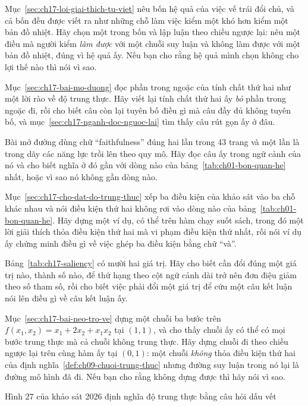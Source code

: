 \cauhoi
\begin{cauhoids}
  \item Mục~\ref{sec:ch17-loi-giai-thich-tu-viet} nêu bốn hệ quả của việc vế trái
đổi chủ, và cả bốn đều được viết ra như những chỗ làm việc kiểm một
khó hơn kiểm một bản đồ nhiệt. Hãy chọn một trong bốn và lập luận theo chiều
ngược lại: nêu một điều mà người kiểm \emph{làm được} với một chuỗi suy luận và
không làm được với một bản đồ nhiệt, đúng vì hệ quả ấy. Nếu bạn cho rằng hệ quả
mình chọn không cho lợi thế nào thì nói vì sao.
  \item Mục~\ref{sec:ch17-bai-mo-duong} đọc phần trong ngoặc của tính chất thứ
hai như một lời rào về độ trung thực. Hãy viết lại tính chất thứ hai ấy \emph{bỏ}
phần trong ngoặc đi, rồi cho biết câu còn lại tuyên bố điều gì mà câu đầy đủ
không tuyên bố, và mục~\ref{sec:ch17-nganh-doc-nguoc-lai} tìm thấy câu rút gọn ấy
ở đâu.
  \item Bài mở đường dùng chữ \enquote{faithfulness} đúng hai lần trong 43 trang
và một lần là trong dãy các năng lực trồi lên theo quy mô. Hãy đọc câu ấy trong
ngữ cảnh của nó và cho biết nghĩa ở đó gần với dòng nào của
bảng~\ref{tab:ch01-bon-quan-he} nhất, hoặc vì sao nó không gần dòng nào.
  \item Mục~\ref{sec:ch17-cho-dat-do-trung-thuc} xếp ba điều kiện của khảo sát
vào ba chỗ khác nhau và nói điều kiện thứ hai không rơi vào dòng nào của
bảng~\ref{tab:ch01-bon-quan-he}. Hãy dựng một ví dụ, có thể trên hàm chạy suốt
sách, trong đó một lời giải thích thỏa điều kiện thứ hai mà vi phạm điều kiện thứ
nhất, rồi nói ví dụ ấy chứng minh điều gì về việc ghép ba điều kiện bằng chữ
\enquote{và}.
  \item Bảng~\ref{tab:ch17-saliency} có mười hai giá trị. Hãy cho biết cần đổi
đúng một giá trị nào, thành số nào, để thứ hạng theo cột ngữ cảnh dài trở nên đơn
điệu giảm theo số tham số, rồi cho biết việc phải đổi một giá trị để cứu một câu
kết luận nói lên điều gì về câu kết luận ấy.
  \item Mục~\ref{sec:ch17-bai-neo-tro-ve} dựng một chuỗi ba bước trên
$f(x_1,x_2) = x_1 + 2x_2 + x_1x_2$ tại $(1,1)$, và cho thấy chuỗi ấy có thể có
mọi bước trung thực mà cả chuỗi không trung thực. Hãy dựng chuỗi đi theo chiều
ngược lại trên cùng hàm ấy tại $(0,1)$: một chuỗi \emph{không} thỏa điều kiện thứ
hai của định nghĩa~\ref{def:ch09-chuoi-trung-thuc} nhưng đường suy luận trong nó
lại là đường mô hình đã đi. Nếu bạn cho rằng không dựng được thì hãy nói vì sao.
  \item Hình 27 của khảo sát 2026 định nghĩa độ trung thực bằng câu hỏi dấu vết

\end{cauhoids}
